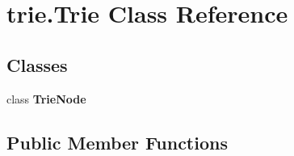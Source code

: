\hypertarget{classtrie_1_1_trie}{}\section{trie.\+Trie Class Reference}
\label{classtrie_1_1_trie}
\subsection*{Classes}
\begin{DoxyCompactItemize}
\item 
class {\bfseries Trie\+Node}
\end{DoxyCompactItemize}
\subsection*{Public Member Functions}

